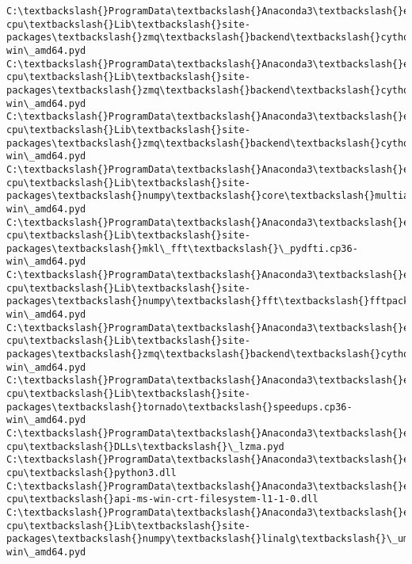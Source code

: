 \documentclass[11pt]{article}
\begin{document}
\begin{Verbatim}[commandchars=\\\{\}]
C:\textbackslash{}ProgramData\textbackslash{}Anaconda3\textbackslash{}envs\textbackslash{}fastai-cpu\textbackslash{}Lib\textbackslash{}site-packages\textbackslash{}zmq\textbackslash{}backend\textbackslash{}cython\textbackslash{}context.cp36-win\_amd64.pyd
C:\textbackslash{}ProgramData\textbackslash{}Anaconda3\textbackslash{}envs\textbackslash{}fastai-cpu\textbackslash{}Lib\textbackslash{}site-packages\textbackslash{}zmq\textbackslash{}backend\textbackslash{}cython\textbackslash{}message.cp36-win\_amd64.pyd
C:\textbackslash{}ProgramData\textbackslash{}Anaconda3\textbackslash{}envs\textbackslash{}fastai-cpu\textbackslash{}Lib\textbackslash{}site-packages\textbackslash{}zmq\textbackslash{}backend\textbackslash{}cython\textbackslash{}constants.cp36-win\_amd64.pyd
C:\textbackslash{}ProgramData\textbackslash{}Anaconda3\textbackslash{}envs\textbackslash{}fastai-cpu\textbackslash{}Lib\textbackslash{}site-packages\textbackslash{}numpy\textbackslash{}core\textbackslash{}multiarray\_tests.cp36-win\_amd64.pyd
C:\textbackslash{}ProgramData\textbackslash{}Anaconda3\textbackslash{}envs\textbackslash{}fastai-cpu\textbackslash{}Lib\textbackslash{}site-packages\textbackslash{}mkl\_fft\textbackslash{}\_pydfti.cp36-win\_amd64.pyd
C:\textbackslash{}ProgramData\textbackslash{}Anaconda3\textbackslash{}envs\textbackslash{}fastai-cpu\textbackslash{}Lib\textbackslash{}site-packages\textbackslash{}numpy\textbackslash{}fft\textbackslash{}fftpack\_lite.cp36-win\_amd64.pyd
C:\textbackslash{}ProgramData\textbackslash{}Anaconda3\textbackslash{}envs\textbackslash{}fastai-cpu\textbackslash{}Lib\textbackslash{}site-packages\textbackslash{}zmq\textbackslash{}backend\textbackslash{}cython\textbackslash{}error.cp36-win\_amd64.pyd
C:\textbackslash{}ProgramData\textbackslash{}Anaconda3\textbackslash{}envs\textbackslash{}fastai-cpu\textbackslash{}Lib\textbackslash{}site-packages\textbackslash{}tornado\textbackslash{}speedups.cp36-win\_amd64.pyd
C:\textbackslash{}ProgramData\textbackslash{}Anaconda3\textbackslash{}envs\textbackslash{}fastai-cpu\textbackslash{}DLLs\textbackslash{}\_lzma.pyd
C:\textbackslash{}ProgramData\textbackslash{}Anaconda3\textbackslash{}envs\textbackslash{}fastai-cpu\textbackslash{}python3.dll
C:\textbackslash{}ProgramData\textbackslash{}Anaconda3\textbackslash{}envs\textbackslash{}fastai-cpu\textbackslash{}api-ms-win-crt-filesystem-l1-1-0.dll
C:\textbackslash{}ProgramData\textbackslash{}Anaconda3\textbackslash{}envs\textbackslash{}fastai-cpu\textbackslash{}Lib\textbackslash{}site-packages\textbackslash{}numpy\textbackslash{}linalg\textbackslash{}\_umath\_linalg.cp36-win\_amd64.pyd

\end{Verbatim}
\end{document}
